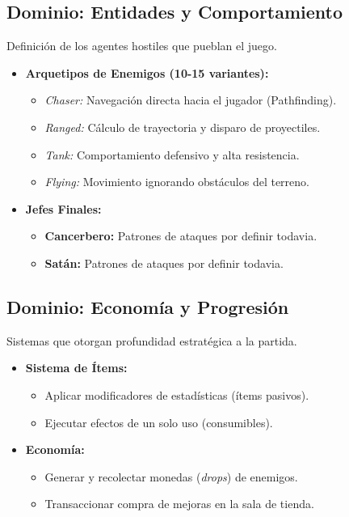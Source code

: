 \subsection{Dominio: Entidades y Comportamiento}
Definición de los agentes hostiles que pueblan el juego.
\begin{itemize}
    \item \textbf{Arquetipos de Enemigos (10-15 variantes):}
    \begin{itemize}
        \item \textit{Chaser:} Navegación directa hacia el jugador (Pathfinding).
        \item \textit{Ranged:} Cálculo de trayectoria y disparo de proyectiles.
        \item \textit{Tank:} Comportamiento defensivo y alta resistencia.
        \item \textit{Flying:} Movimiento ignorando obstáculos del terreno.
    \end{itemize}
    \item \textbf{Jefes Finales:}
    \begin{itemize}
        \item \textbf{Cancerbero:} Patrones de ataques por definir todavia.
        \item \textbf{Satán:} Patrones de ataques por definir todavia.
    \end{itemize}
\end{itemize}

\subsection{Dominio: Economía y Progresión}
Sistemas que otorgan profundidad estratégica a la partida.
\begin{itemize}
    \item \textbf{Sistema de Ítems:}
    \begin{itemize}
        \item Aplicar modificadores de estadísticas (ítems pasivos).
        \item Ejecutar efectos de un solo uso (consumibles).
    \end{itemize}
    \item \textbf{Economía:}
    \begin{itemize}
        \item Generar y recolectar monedas (\textit{drops}) de enemigos.
        \item Transaccionar compra de mejoras en la sala de tienda.
    \end{itemize}
\end{itemize}

